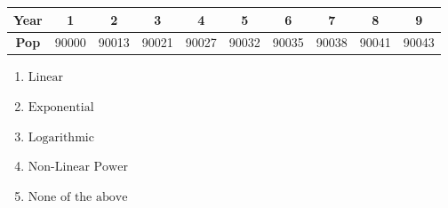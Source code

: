 \documentclass[14pt]{extbook}
\begin{document}
\begin{enumerate}
{\begin{tabular}{c|c|c|c|c|c|c|c|c|c}
\textbf{Year} &1 &2 &3 &4 &5 &6 &7 &8 &9\tabularnewline \hline
\textbf{Pop} &90000 &90013 &90021 &90027 &90032 &90035 &90038 &90041 &90043\end{tabular}\begin{enumerate}[label=\Alph*.]
\item \( \text{Linear} \)
\item \( \text{Exponential} \)
\item \( \text{Logarithmic} \)
\item \( \text{Non-Linear Power} \)
\item \( \text{None of the above} \)

\end{enumerate} }
\end{enumerate}
\end{document}
